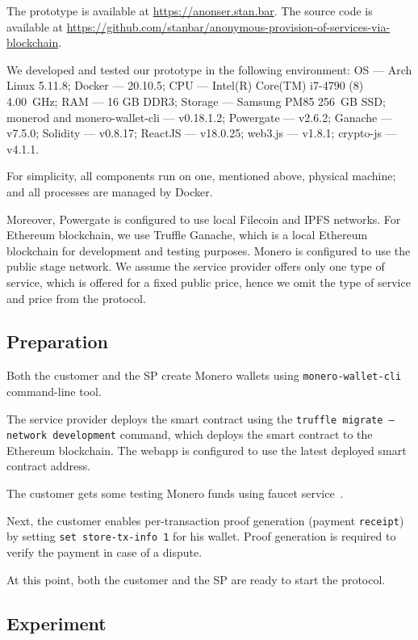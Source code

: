 The prototype is available at \url{https://anonser.stan.bar}. The source code is available at \url{https://github.com/stanbar/anonymous-provision-of-services-via-blockchain}.

We developed and tested our prototype in the following environment: OS — Arch Linux 5.11.8; Docker — 20.10.5; CPU — Intel(R) Core(TM) i7-4790 (8) 4.00~GHz; RAM — 16 GB DDR3; Storage — Samsung PM85 256~GB SSD; monerod and monero-wallet-cli — v0.18.1.2; Powergate — v2.6.2; Ganache — v7.5.0; Solidity — v0.8.17; ReactJS — v18.0.25; web3.js — v1.8.1; crypto-js — v4.1.1.

For simplicity, all components run on one, mentioned above, physical machine; and all processes are managed by Docker. 

Moreover, Powergate is configured to use local Filecoin and IPFS networks.
For Ethereum blockchain, we use Truffle Ganache, which is a local Ethereum blockchain for development and testing purposes. 
Monero is configured to use the public stage network.
We assume the service provider offers only one type of service, which is offered for a fixed public price, hence we omit the type of service and price from the protocol.

\subsection*{Preparation}

Both the customer and the SP create Monero wallets using \texttt{monero-wallet-cli} command-line tool.

The service provider deploys the smart contract using the \texttt{truffle migrate --network development} command, which deploys the smart contract to the Ethereum blockchain. The webapp is configured to use the latest deployed smart contract address.

The customer gets some testing Monero funds using faucet service~\cite{rinoMoneroStagenetFaucet}.

Next, the customer enables per-transaction proof generation (payment \texttt{receipt}) by setting \texttt{set store-tx-info 1} for his wallet. Proof generation is required to verify the payment in case of a dispute.

At this point, both the customer and the SP are ready to start the protocol.

\subsection*{Experiment}

